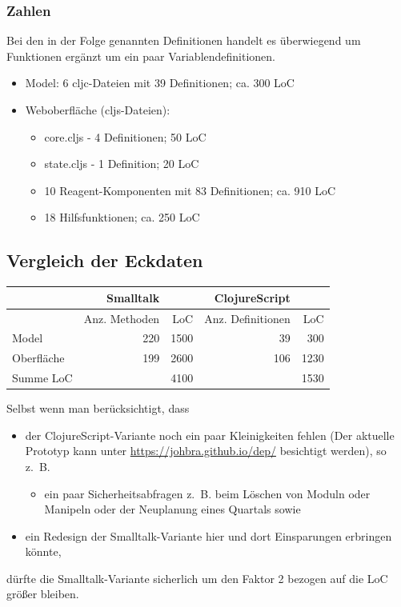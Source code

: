 \documentclass[11pt]{article}
\begin{document}
\subsubsection*{Zahlen}
\label{sec:org2165500}
Bei den in der Folge genannten Definitionen handelt es überwiegend um
Funktionen ergänzt um ein paar Variablendefinitionen.
\begin{itemize}
\item Model: 6 cljc-Dateien mit 39 Definitionen; ca. 300 LoC
\item Weboberfläche (cljs-Dateien):
\begin{itemize}
\item core.cljs - 4 Definitionen; 50 LoC
\item state.cljs - 1 Definition; 20 LoC
\item 10 Reagent-Komponenten mit 83 Definitionen; ca. 910 LoC
\item 18 Hilfsfunktionen; ca. 250 LoC
\end{itemize}
\end{itemize}
\subsection*{Vergleich der Eckdaten}
\label{sec:orga038923}

\begin{center}
\begin{tabular}{lrrrr}
 & Smalltalk &  & ClojureScript & \\
\hline
 & Anz. Methoden & LoC & Anz. Definitionen & LoC\\
\hline
Model & 220 & 1500 & 39 & 300\\
Oberfläche & 199 & 2600 & 106 & 1230\\
\hline
Summe LoC &  & 4100 &  & 1530\\
\hline
\end{tabular}
\end{center}

Selbst wenn man berücksichtigt, dass
\begin{itemize}
\item der ClojureScript-Variante noch ein paar Kleinigkeiten fehlen (Der
aktuelle Prototyp kann unter \url{https://johbra.github.io/dep/} besichtigt
werden), so z.~B. 
\begin{itemize}
\item ein paar Sicherheitsabfragen z.~B. beim Löschen von Moduln
oder Manipeln oder der Neuplanung eines Quartals sowie
\end{itemize}
\item ein Redesign der Smalltalk-Variante hier und dort Einsparungen
erbringen könnte,
\end{itemize}
dürfte die Smalltalk-Variante sicherlich um den Faktor 2 bezogen auf
die LoC größer bleiben.
\end{document}
